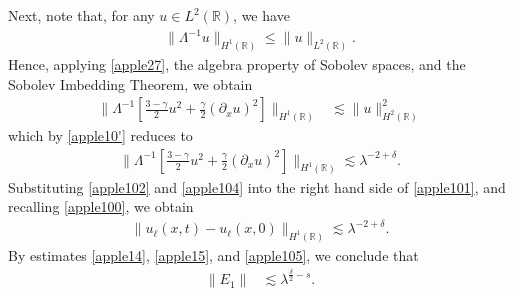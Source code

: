 \documentclass[12pt,reqno]{amsart}
\newcommand{\rr}{\mathbb{R}}
\newcommand{\p}{\partial}
\theoremstyle{plain}  %
\theoremstyle{definition}
\begin{document}
Next, note that, for any $u \in L^2(\rr)$, we
have
\begin{equation}
	\begin{split}
		\|\Lambda^{-1} u \|_{H^1(\rr)} 
		\le \|u\|_{L^2(\rr)}.
		\label{apple27}
	\end{split}
\end{equation}
Hence, applying \eqref{apple27}, the algebra property of Sobolev spaces,
and the Sobolev Imbedding Theorem, we obtain
\begin{equation*}
	\begin{split}
		\|\Lambda^{-1} \left[ \frac{3-\gamma}{2}u^2 +
		\frac{\gamma}{2}\left( \p_x u \right)^2 \right] \|_{H^1(\rr)}
		& \lesssim \|u\|_{H^2(\rr)}^2
	\end{split}
\end{equation*}
which by \eqref{apple10'} reduces to 
\begin{equation}
	\begin{split}
		\|\Lambda^{-1} \left[ \frac{3-\gamma}{2}u^2 +
		\frac{\gamma}{2}\left( \p_x u \right)^2 \right] \|_{H^1(\rr)}
		\lesssim \lambda^{-2 + \delta}.
		\label{apple104}
	\end{split}
\end{equation}
Substituting \eqref{apple102} and \eqref{apple104} into the right hand side of
\eqref{apple101}, and recalling \eqref{apple100}, we obtain
\begin{equation}
	\begin{split}
		\|u_\ell(x,t) - u_\ell(x,0)\|_{H^1(\rr)} \lesssim \lambda^{-2 + \delta}.
		\label{apple105}
	\end{split}
\end{equation}
By estimates \eqref{apple14}, \eqref{apple15}, and \eqref{apple105}, we conclude that 
\begin{equation}
	\begin{split}
		\|E_1\|
		& \lesssim \lambda^{\frac{\delta}{2}-s}.
		\label{apple106}
	\end{split}
\end{equation}
\end{document}

